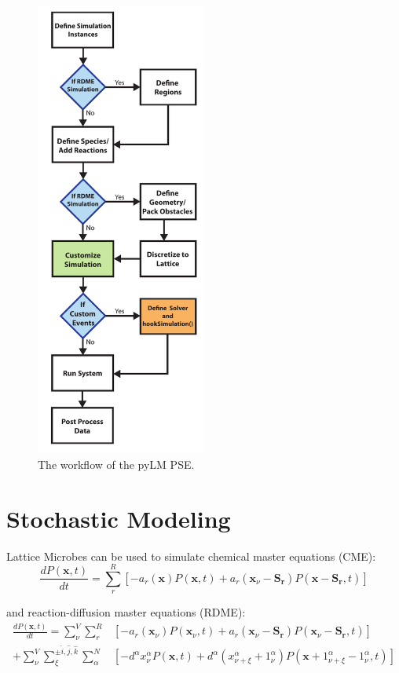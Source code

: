 \begin{figure}[h!]
  \centering
      \includegraphics[width=0.5\textwidth]{Figures/Workflow.pdf}
  \caption{The workflow of the pyLM PSE.} \label{fig:workflow}
\end{figure}

\section{Stochastic Modeling}

Lattice Microbes can be used to simulate chemical master equations (CME):
\begin{equation*}
\frac{dP(\mathbf{x},t)}{dt}=\sum_{r}^{R} [-a_r({{\mathbf{x}}}) P({{\mathbf{x}}},t) + a_r({{\mathbf{x}}}_\nu-\mathbf{S_r}) P({{\mathbf{x}}}-\mathbf{S_r},t)]
\end{equation*}

\noindent and reaction-diffusion master equations (RDME):
\begin{align*}
\frac{dP(\mathbf{x},t)}{dt}=\sum_{\nu}^{V}\sum_{r}^{R} &[-a_r({{\mathbf{x}}}_\nu) P({{\mathbf{x}}}_\nu,t) + a_r({{\mathbf{x}}}_\nu-\mathbf{S_r}) P({{\mathbf{x}}}_\nu-\mathbf{S_r},t)]\\
+\sum_{\nu}^{V}\sum_{\xi}^{\pm\hat{i},\hat{j},\hat{k}}\sum_{\alpha}^{N} &[-d^{\alpha} x_{\nu}^{\alpha} P({{\mathbf{x}}},t) + d^{\alpha} (x_{\nu+\xi}^{\alpha}+1_{\nu}^{\alpha}) P({{\mathbf{x}}}+1_{\nu+\xi}^{\alpha}-1_{\nu}^{\alpha},t)]
\end{align*}

